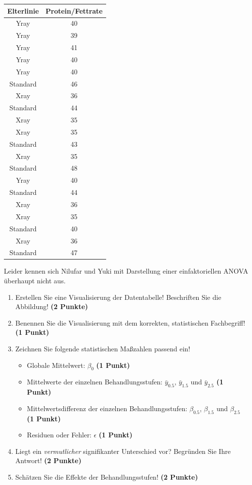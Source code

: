 \documentclass[a4paper, 9pt]{scrartcl}\usepackage[]{graphicx}\usepackage[]{xcolor}
\newenvironment{knitrout}{}{} %
\begin{document}
\begin{knitrout}
\color{fgcolor}\begin{table}[!h]
\centering
\begin{tabular}{cc}
\toprule
Elterlinie & Protein/Fettrate\\
\midrule
Yray & 40\\
Yray & 39\\
Yray & 41\\
Yray & 40\\
Yray & 40\\
\addlinespace
Standard & 46\\
Xray & 36\\
Standard & 44\\
Xray & 35\\
Xray & 35\\
\addlinespace
Standard & 43\\
Xray & 35\\
Standard & 48\\
Yray & 40\\
Standard & 44\\
\addlinespace
Xray & 36\\
Xray & 35\\
Standard & 40\\
Xray & 36\\
Standard & 47\\
\bottomrule
\end{tabular}
\end{table}

\end{knitrout}

Leider kennen sich Nilufar und Yuki mit Darstellung einer einfaktoriellen ANOVA überhaupt nicht aus. 

\begin{enumerate}
\item Erstellen  Sie  eine  Visualisierung  der  Datentabelle! Beschriften  Sie  die  Abbildung! \textbf{(2 Punkte)}
\item Benennen Sie die Visualisierung mit dem korrekten, statistischen Fachbegriff! \textbf{(1 Punkt)}
\item Zeichnen Sie folgende statistischen Maßzahlen passend ein! 
  \begin{itemize}
  \item Globale Mittelwert: $\beta_0$ \textbf{(1 Punkt)}
  \item Mittelwerte der einzelnen Behandlungsstufen: $\bar{y}_{0.5}$, $\bar{y}_{1.5}$ und $\bar{y}_{2.5}$ \textbf{(1 Punkt)}
  \item Mittelwertsdifferenz der einzelnen Behandlungsstufen: $\beta_{0.5}$, $\beta_{1.5}$ und $\beta_{2.5}$ \textbf{(1 Punkt)}
  \item Residuen oder Fehler: $\epsilon$ \textbf{(1 Punkt)}
  \end{itemize}
\item Liegt ein \textit{vermutlicher} signifikanter Unterschied vor? Begründen Sie Ihre Antwort! \textbf{(2 Punkte)}
\item Schätzen Sie die Effekte der Behandlungsstufen! \textbf{(2 Punkte)}
\end{enumerate}
 
\end{document}
